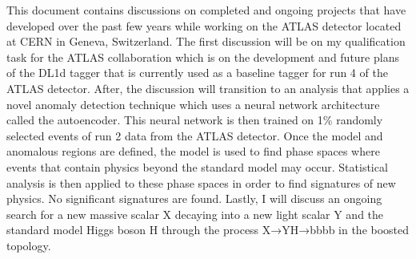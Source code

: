 This document contains discussions on completed and ongoing projects that have developed over the past few years 
while working on the ATLAS detector located at CERN in Geneva, Switzerland. The first discussion will be on my 
qualification task for the ATLAS collaboration which is on the development and future plans of the DL1d tagger
that is currently used as a baseline tagger for run 4 of the ATLAS detector. After, the discussion will 
transition to an analysis that applies a novel anomaly detection technique which uses a neural network 
architecture called the autoencoder. This neural network is then trained on 1\% randomly selected events of 
run 2 data from the ATLAS detector. Once the model and anomalous regions are defined, the model is used to find 
phase spaces where events that contain physics beyond the standard model may occur. Statistical analysis is 
then applied to these phase spaces in order to find signatures of new physics. No significant signatures are 
found. Lastly, I will discuss an ongoing search for a new massive scalar X decaying into a new light scalar Y
and the standard model Higgs boson H through the process X→YH→bbbb in the boosted topology. 
\par 

